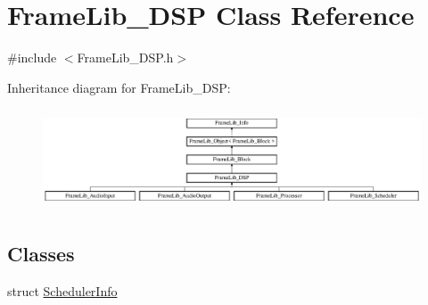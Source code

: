 \hypertarget{class_frame_lib___d_s_p}{}\section{Frame\+Lib\+\_\+\+D\+SP Class Reference}
\label{class_frame_lib___d_s_p}


{\ttfamily \#include $<$Frame\+Lib\+\_\+\+D\+S\+P.\+h$>$}

Inheritance diagram for Frame\+Lib\+\_\+\+D\+SP\+:\begin{figure}[H]
\begin{center}
\leavevmode
\includegraphics[height=3.017241cm]{class_frame_lib___d_s_p}
\end{center}
\end{figure}
\subsection*{Classes}
\begin{DoxyCompactItemize}
\item 
struct \hyperlink{struct_frame_lib___d_s_p_1_1_scheduler_info}{Scheduler\+Info}
\end{DoxyCompactItemize}
